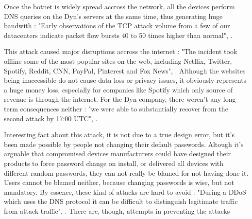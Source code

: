 \documentclass[a4paper,man,natbib,12]{apa6}
\begin{document}
\qquad Once the botnet is widely spread accross the network, all the devices perform DNS queries on the Dyn's servers at the same time, thus generating huge bandwith : "Early observations of the TCP attack volume from a few of our datacenters indicate packet flow bursts 40 to 50 times higher than normal", \cite{Dyn}. 

\qquad This attack caused major disruptions accross the internet : "The incident took offline some of the most popular sites on the web, including Netflix, Twitter, Spotify, Reddit, CNN, PayPal, Pinterest and Fox News", \cite{guardian}. Although the websites being inaccessible do not cause data loss or privacy issues, it obviously represents a huge money loss, especially for companies like Spotify which only source of revenue is through the internet. For the Dyn company, there weren't any long-term consequences neither : "we were able to substantially recover from the second attack by 17:00 UTC", \cite{Dyn}.

\qquad Interesting fact about this attack, it is not due to a true design error, but it's been made possible by people not changing their default passwords. Altough it's arguable that compromised devices manufacturers could have designed their products to force password change on install, or delivered all devices with different random passwords, they can not really be blamed for not having done it. Users cannot be blamed neither, because changing passwords is wise, but not mandatory. By essence, these kind of attacks are hard to avoid : "During a DDoS which uses the DNS protocol it can be difficult to distinguish legitimate traffic from attack traffic", \cite{Dyn}. There are, though, attempts in preventing the attacks




\end{document}
